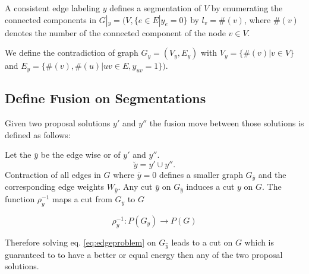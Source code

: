 \documentclass[10pt,twocolumn,letterpaper]{article}
\begin{document}
A consistent edge labeling $y$ defines a segmentation of $V$ by enumerating the connected components 
in $G|_y=(V,\{e\in E|y_e=0\}$ by $l_v = \#(v)$, where $\#(v)$ denotes the number of the connected component of the node $v\in V$.

We define the contradiction of graph $G_y=(V_y,E_y)$
with $V_y=\{\#(v)|v\in V\}$ and $E_y=\{\#(v),\#(u)|uv\in E, y_{uv}=1\})$.

%


\subsection{Define Fusion on Segmentations}

Given two proposal solutions $y'$ and $y''$
the fusion move between those solutions is defined
as follows:

Let the $\bar{y}$ be the edge wise or of  $y'$ and $y''$.
\begin{equation}
\breve{y} =  y' \cup y''.
\end{equation}
Contraction of all edges in $G$ where $\bar{y}=0$ defines
a smaller graph $G_{\bar{y}}$ and the corresponding
edge weights $W_{\hat{y}}$.
Any cut $\bar{y}$ on $G_{\hat{y}}$ induces a cut $y$ on $G$.
The function 
$\rho_y^{-1}$ maps a cut from $G_{\hat{y}}$  to $G$ 

\begin{equation}
   \rho_y^{-1} : P(G_y) \to P(G)
\end{equation}

Therefore solving eq. \ref{eq:edgeproblem} 
on $G_{\hat{y}}$
leads to a cut on $G$ which is guaranteed to 
to have a better or equal energy
then any of the two proposal solutions.






\end{document}

